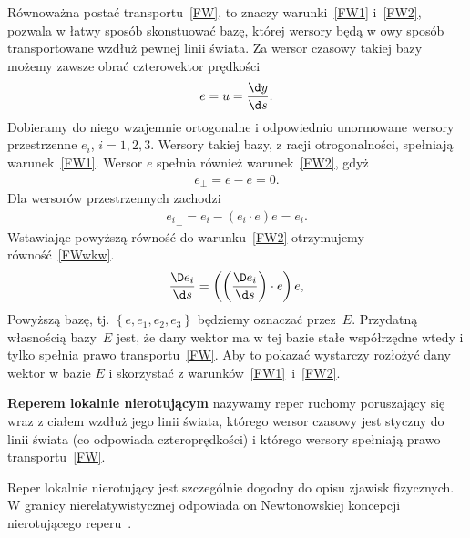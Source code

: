 Równoważna postać transportu~\eqref{FW}, to znaczy 
warunki~\eqref{FW1} i~\eqref{FW2}, pozwala w łatwy sposób 
skonstuować bazę, której wersory będą w owy sposób transportowane 
wzdłuż pewnej linii świata.
Za wersor czasowy takiej bazy możemy zawsze obrać czterowektor prędkości 
\begin{align}
e = u = \frac{\d y}{\d s}.
\end{align}
Dobieramy do niego wzajemnie ortogonalne i odpowiednio unormowane wersory 
przestrzenne $e_i$, $i=1,2,3$. Wersory takiej bazy, z racji otrogonalności,
spełniają warunek~\eqref{FW1}. Wersor $e$ spełnia również
warunek~\eqref{FW2}, gdyż
\begin{align}
e_\perp = e - e = 0.
\end{align}
Dla wersorów przestrzennych zachodzi
\begin{align}
{e_i}_\perp = e_i - (e_i \cdot e )e = e_i.
\end{align}
Wstawiając powyższą równość do warunku~\eqref{FW2} otrzymujemy 
równość~\eqref{FWwkw}. 
\begin{align}\label{FWwkw}
\frac{\D e_i }{\d s} = 
\left( \left(\frac{\D e_i }{\d s}\right) \cdot e\right) e, 
\end{align}
Powyższą bazę, tj. $\left\{ e,e_1,e_2,e_3\right\}$ 
będziemy oznaczać przez~$E$.
Przydatną własnością bazy~$E$ jest, że dany wektor 
ma w tej bazie stałe współrzędne wtedy i tylko 
spełnia prawo transportu~\eqref{FW}.%
Aby to pokazać wystarczy rozłożyć dany wektor w bazie 
$E$ i skorzystać z 
warunków~\eqref{FW1}~i~\eqref{FW2}.

\begin{definition}
\textbf{Reperem lokalnie nierotującym} nazywamy reper ruchomy poruszający
się wraz z ciałem wzdłuż jego linii świata, którego 
wersor czasowy jest styczny do linii świata (co odpowiada czteroprędkości)
i którego wersory spełniają prawo transportu~\eqref{FW}.
\end{definition}
Reper lokalnie nierotujący jest szczególnie dogodny do opisu zjawisk 
fizycznych. W granicy nierelatywistycznej odpowiada on Newtonowskiej 
koncepcji nierotującego reperu~\cite{synge1960}.
